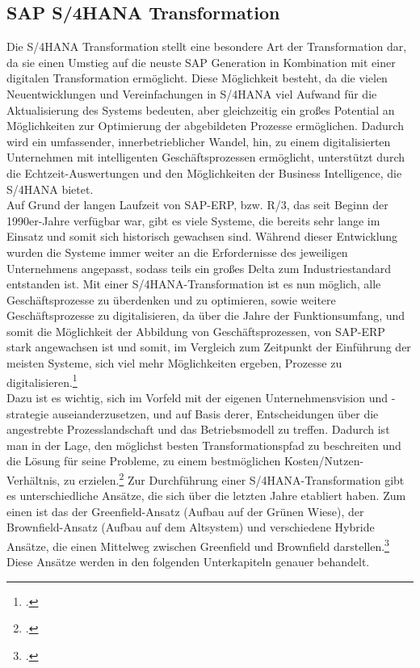 \subsection{SAP S/4HANA Transformation}
Die S/4HANA Transformation stellt eine besondere Art der Transformation dar, da sie einen Umstieg auf die neuste SAP Generation in Kombination mit einer digitalen Transformation ermöglicht. Diese Möglichkeit besteht, da die vielen Neuentwicklungen und Vereinfachungen in S/4HANA viel Aufwand für die Aktualisierung des Systems bedeuten, aber gleichzeitig ein großes Potential an Möglichkeiten zur Optimierung der abgebildeten Prozesse ermöglichen. Dadurch wird ein umfassender, innerbetrieblicher Wandel, hin, zu einem digitalisierten Unternehmen mit intelligenten Geschäftsprozessen ermöglicht, unterstützt durch die Echtzeit-Auswertungen und den Möglichkeiten der Business Intelligence, die S/4HANA bietet.
\\Auf Grund der langen Laufzeit von SAP-ERP, bzw. R/3, das seit Beginn der 1990er-Jahre verfügbar war, gibt es viele Systeme, die bereits sehr lange im Einsatz und somit sich historisch gewachsen sind. Während dieser Entwicklung wurden die Systeme immer weiter an die Erfordernisse des jeweiligen Unternehmens angepasst, sodass teils ein großes Delta zum Industriestandard entstanden ist. Mit einer S/4HANA-Transformation ist es nun möglich, alle Geschäftsprozesse zu überdenken und zu optimieren, sowie weitere Geschäftsprozesse zu digitalisieren, da über die Jahre der Funktionsumfang, und somit die Möglichkeit der Abbildung von Geschäftsprozessen, von SAP-ERP stark angewachsen ist und somit, im Vergleich zum Zeitpunkt der Einführung der meisten Systeme, sich viel mehr Möglichkeiten ergeben, Prozesse zu digitalisieren.\footcite[Vgl.][]{s4-interview}
\\Dazu ist es wichtig, sich im Vorfeld mit der eigenen Unternehmensvision und -strategie auseianderzusetzen, und auf Basis derer, Entscheidungen über die angestrebte Prozesslandschaft und das Betriebsmodell zu treffen. Dadurch ist man in der Lage, den möglichst besten Transformationspfad zu beschreiten und die Lösung für seine Probleme, zu einem bestmöglichen Kosten/Nutzen-Verhältnis, zu erzielen.\footcite[Vgl.][]{ao-blog}
Zur Durchführung einer S/4HANA-Transformation gibt es unterschiedliche Ansätze, die sich über die letzten Jahre etabliert haben. Zum einen ist das der Greenfield-Ansatz (Aufbau auf der \glqq{}Grünen Wiese\grqq{}), der Brownfield-Ansatz (Aufbau auf dem Altsystem) und verschiedene Hybride Ansätze, die einen Mittelweg zwischen Greenfield und Brownfield darstellen.\footcite[Vgl.][]{ao-blog} Diese Ansätze werden in den folgenden Unterkapiteln genauer behandelt.
